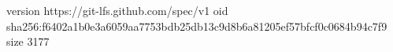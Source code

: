version https://git-lfs.github.com/spec/v1
oid sha256:f6402a1b0e3a6059aa7753bdb25db13c9d8b6a81205ef57bfcf0c0684b94c7f9
size 3177
